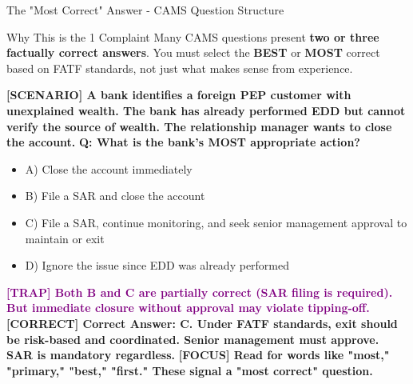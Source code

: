 \documentclass[11pt,a4paper]{beamer}
\newcommand{\examfocus}[1]{\textcolor{orange!80!black}{\textbf{[FOCUS] #1}}}
\newcommand{\trap}[1]{\textcolor{purple}{\textbf{[TRAP] #1}}}
\newcommand{\correct}[1]{\textcolor{green!50!black}{\textbf{[CORRECT] #1}}}
\newcommand{\scenario}[1]{\textcolor{blue!70!black}{\textbf{[SCENARIO] #1}}}
\begin{document}
\begin{frame}{The "Most Correct" Answer - CAMS Question Structure}
\begin{block}{Why This is the 1 Complaint}
Many CAMS questions present \textbf{two or three factually correct answers}. You must select the \textbf{BEST} or \textbf{MOST} correct based on FATF standards, not just what makes sense from experience.
\end{block}
\scenario{A bank identifies a foreign PEP customer with unexplained wealth. The bank has already performed EDD but cannot verify the source of wealth. The relationship manager wants to close the account.}
\vspace{0.2cm}
\textbf{Q: What is the bank's MOST appropriate action?}
\begin{itemize}
\item A) Close the account immediately
\item B) File a SAR and close the account
\item C) File a SAR, continue monitoring, and seek senior management approval to maintain or exit
\item D) Ignore the issue since EDD was already performed
\end{itemize}
\trap{Both B and C are partially correct (SAR filing is required). But immediate closure without approval may violate tipping-off.}
\correct{Correct Answer: C. Under FATF standards, exit should be risk-based and coordinated. Senior management must approve. SAR is mandatory regardless.}
\examfocus{Read for words like "most," "primary," "best," "first." These signal a "most correct" question.}
\end{frame}

\end{document}
